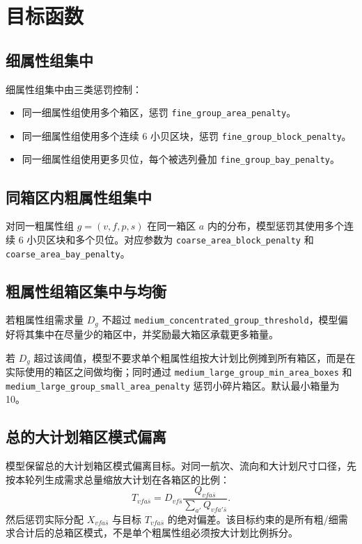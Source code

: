 \documentclass[UTF8,a4paper,11pt]{ctexart}
\newcommand{\code}[1]{\nolinkurl{#1}}
\begin{document}
\section{目标函数}

\subsection{细属性组集中}

细属性组集中由三类惩罚控制：
\begin{itemize}
  \item 同一细属性组使用多个箱区，惩罚 \code{fine_group_area_penalty}。
  \item 同一细属性组使用多个连续 6 小贝区块，惩罚 \code{fine_group_block_penalty}。
  \item 同一细属性组使用更多贝位，每个被选列叠加 \code{fine_group_bay_penalty}。
\end{itemize}

\subsection{同箱区内粗属性组集中}

对同一粗属性组 \(g=(v,f,p,s)\) 在同一箱区 \(a\) 内的分布，模型惩罚其使用多个连续 6 小贝区块和多个贝位。对应参数为
\code{coarse_area_block_penalty} 和 \code{coarse_area_bay_penalty}。

\subsection{粗属性组箱区集中与均衡}

若粗属性组需求量 \(D_g\) 不超过 \code{medium_concentrated_group_threshold}，模型偏好将其集中在尽量少的箱区中，并奖励最大箱区承载更多箱量。

若 \(D_g\) 超过该阈值，模型不要求单个粗属性组按大计划比例摊到所有箱区，而是在实际使用的箱区之间做均衡；同时通过 \code{medium_large_group_min_area_boxes} 和 \code{medium_large_group_small_area_penalty} 惩罚小碎片箱区。默认最小箱量为 10。

\subsection{总的大计划箱区模式偏离}

模型保留总的大计划箱区模式偏离目标。对同一航次、流向和大计划尺寸口径，先按本轮列生成需求总量缩放大计划在各箱区的比例：
\[
T_{vfa\bar{s}}
=D_{vf\bar{s}}
\frac{Q_{vfa\bar{s}}}{\sum_{a'}Q_{vfa'\bar{s}}}.
\]
然后惩罚实际分配 \(X_{vfa\bar{s}}\) 与目标 \(T_{vfa\bar{s}}\) 的绝对偏差。该目标约束的是所有粗/细需求合计后的总箱区模式，不是单个粗属性组必须按大计划比例拆分。
\end{document}
